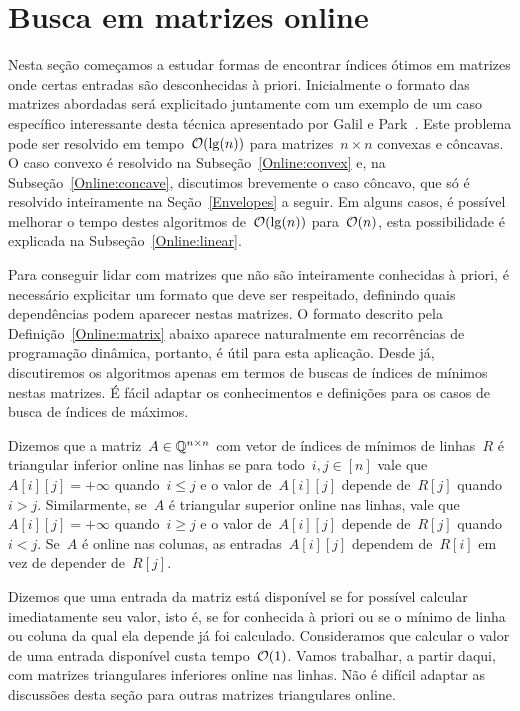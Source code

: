 \section{Busca em matrizes online}
\label{Online}

Nesta seção começamos a estudar formas de encontrar índices ótimos em matrizes onde certas entradas são desconhecidas à priori. Inicialmente o formato das matrizes abordadas será explicitado juntamente com um exemplo de um caso específico interessante desta técnica apresentado por Galil e Park~\cite{Galil:1992}. Este problema pode ser resolvido em tempo~$\mathcal{O}(\lg(n))$ para matrizes~$n \times n$ convexas e côncavas. O caso convexo é resolvido na Subseção~\ref{Online:convex} e, na Subseção~\ref{Online:concave}, discutimos brevemente o caso côncavo, que só é resolvido inteiramente na Seção~\ref{Envelopes} a seguir. Em alguns casos, é possível melhorar o tempo destes algoritmos de~$\mathcal{O}(\lg(n))$ para~$\mathcal{O}(n)$, esta possibilidade é explicada na Subseção~\ref{Online:linear}.

Para conseguir lidar com matrizes que não são inteiramente conhecidas à priori, é necessário explicitar um formato que deve ser respeitado, definindo quais dependências podem aparecer nestas matrizes. O formato descrito pela Definição~\ref{Online:matrix} abaixo aparece naturalmente em recorrências de programação dinâmica, portanto, é útil para esta aplicação. Desde já, discutiremos os algoritmos apenas em termos de buscas de índices de mínimos nestas matrizes. É fácil adaptar os conhecimentos e definições para os casos de busca de índices de máximos.

\begin{defi} \label{Online:matrix}
Dizemos que a matriz~$A \in \mathbb{Q}^{n \times n}$ com vetor de índices de mínimos de linhas~$R$ é triangular inferior online nas linhas se para todo~${ i,j \in [n] }$ vale que~${ A[i][j] = +\infty }$ quando~${ i \leq j }$ e o valor de~$A[i][j]$ depende de~$R[j]$ quando~${ i > j }$. Similarmente, se~$A$ é triangular superior online nas linhas, vale que~${ A[i][j] = +\infty }$ quando~${ i \geq j }$ e o valor de~$A[i][j]$ depende de~$R[j]$ quando~${ i < j}$. Se~$A$ é online nas colunas, as entradas~$A[i][j]$ dependem de~$R[i]$ em vez de depender de~$R[j]$.
\end{defi}

Dizemos que uma entrada da matriz está disponível se for possível calcular imediatamente seu valor, isto é, se for conhecida à priori ou se o mínimo de linha ou coluna da qual ela depende já foi calculado. Consideramos que calcular o valor de uma entrada disponível custa tempo~$\mathcal{O}(1)$. Vamos trabalhar, a partir daqui, com matrizes triangulares inferiores online nas linhas. Não é difícil adaptar as discussões desta seção para outras matrizes triangulares online.

